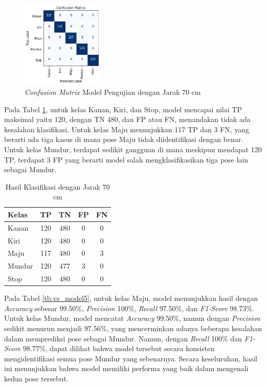 \begin{figure} [H] \centering
  \includegraphics[width=0.35\textwidth]{gambar/bab4/model8 (90cm)/matrix.png}
  \caption{\emph{Confusion Matrix} Model Pengujian dengan Jarak 70 cm}
  \label{fig:matrix5}
\end{figure}

Pada Tabel \ref{tb:cm_model5}, untuk kelas Kanan, Kiri, dan Stop, model mencapai nilai TP maksimal yaitu 120, dengan TN 480, dan FP atau FN, menandakan tidak ada kesalahan klasifikasi. Untuk kelas Maju menunjukkan 117 TP dan 3 FN, yang berarti ada tiga kasus di mana pose Maju tidak diidentifikasi dengan benar. Untuk kelas Mundur, terdapat sedikit gangguan di mana meskipun mendapat 120 TP, terdapat 3 FP yang berarti model salah mengklasifikasikan tiga pose lain sebagai Mundur.

\begin{longtable}{|l|c|c|c|c|}
  \caption{Hasil Klasifikasi dengan Jarak 70 cm}
  \label{tb:cm_model5} \\
  \hline
  \rowcolor[HTML]{C0C0C0} 
  \textbf{Kelas} & \textbf{TP} & \textbf{TN} & \textbf{FP} & \textbf{FN} \\ \hline
  Kanan    & 120          & 480         & 0           & 0           \\ \hline
  Kiri      & 120          & 480         & 0           & 0           \\ \hline
  Maju      & 117          & 480         & 0           & 3           \\ \hline
  Mundur     & 120          & 477         & 3           & 0           \\ \hline
  Stop  & 120          & 480         & 0           & 0           \\ \hline
\end{longtable}


Pada Tabel \ref{tb:vs_model5}, untuk kelas Maju, model menunjukkan hasil dengan \emph{Accuracy} sebesar 99.50\%, \emph{Precision} 100\%, \emph{Recall} 97.50\%, dan \emph{F1-Score} 98.73\%. Untuk kelas Mundur, model mencatat \emph{Accuracy} 99.50\%, namun dengan \emph{Precision} sedikit menurun menjadi 97.56\%, yang mencerminkan adanya beberapa kesalahan dalam memprediksi pose sebagai Mundur. Namun, dengan \emph{Recall} 100\% dan \emph{F1-Score} 98.77\%, dapat dilihat bahwa model tersebut secara konsisten mengidentifikasi semua pose Mundur yang sebenarnya. Secara keseluruhan, hasil ini menunjukkan bahwa model memiliki performa yang baik dalam mengenali kedua pose tersebut.

